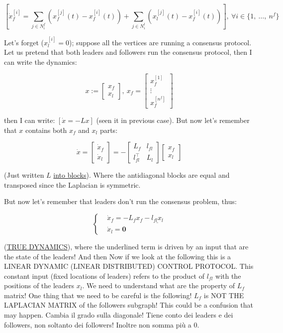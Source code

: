 \[	
	[\dot{x}_f^{[i]} = \sum_{j\in N_i^f}{(x_f^{[j]}(t) - x_f^{[i]}(t))} + \sum_{j\in N_i^l}{(x_l^{[j]}(t) - x_f^{[i]}(t))}],\ \forall i \in\{1,\ \dots,\ n^f\}
\]

Let's forget ($x_l^{[i]} = 0$); suppose all the vertices are running a consensus protocol. Let us pretend that both leaders and followers run the consensus protocol, then I can write the dynamics:

\[
	x := \begin{bmatrix}x_f\\x_l\end{bmatrix},\ x_f = \begin{bmatrix}x_f^{[1]}\\ \vdots\\ x_f^{[n^f]}\end{bmatrix}
\]

then I can write: $[\dot{x}=-Lx]$ (seen it in previous case). But now let's remember that $x$ contains both $x_f$ and $x_l$ parts:

\[
	\dot{x} = \begin{bmatrix}\dot{x}_f\\ \dot{x}_l\end{bmatrix} = -\begin{bmatrix}L_f&l_{fl}\\l^{\top}_{fl}&L_l\end{bmatrix}\begin{bmatrix}x_f\\x_l\end{bmatrix}
\]

(Just written $L$ \underline{into blocks}). Where the antidiagonal blocks are equal and transposed since the Laplacian is symmetric.

But now let's remember that leaders don't run the consensus problem, thus:

\[
	\left\{
	\begin{aligned}
	&\dot{x}_f = -L_fx_f - \underline{l_{fl}x_l} \\
	&\dot{x}_l = \mathbf{0}
	\end{aligned} 
	\right.
\]

(\underline{TRUE DYNAMICS}), where the underlined term is driven by an input that are the state of the leaders! And then Now if we look at the following this is a LINEAR DYNAMIC (LINEAR DISTRIBUTED) CONTROL PROTOCOL. This constant input (fixed locations of leaders) refers to the product of $l_{fl}$ with the positions of the leaders $x_l$. We need to understand what are the property of $L_f$ matrix! One thing that we need to be careful is the following! $L_f$ is NOT THE LAPLACIAN MATRIX of the followers subgraph! This could be a confusion that may happen. Cambia il grado sulla diagonale! Tiene conto dei leaders e dei followers, non soltanto dei followers! Inoltre non somma più a 0.

